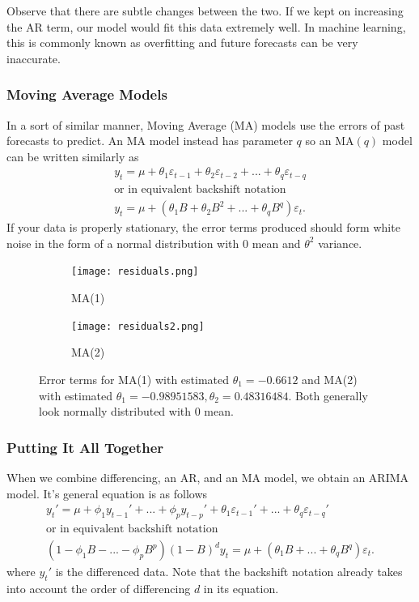 \documentclass{article}
\begin{document}
    Observe that there are subtle changes between the two. If we kept on increasing the AR term, our model would fit this data extremely well. In machine learning, this is commonly known as overfitting and future forecasts can be very inaccurate.

  \subsubsection{Moving Average Models}
    In a sort of similar manner, Moving Average (MA) models use the errors of past forecasts to predict. An MA model instead has parameter $q$ so an MA$(q)$ model can be written similarly as
    \begin{gather*}
      y_t = \mu + \theta_1 \varepsilon_{t-1} + \theta_2 \varepsilon_{t-2} + ... + \theta_q \varepsilon_{t-q}\\
      \text{or in equivalent backshift notation}\\
      y_t = \mu + (\theta_1B + \theta_2B^2 + ... + \theta_qB^q)\varepsilon_t.
    \end{gather*}
    If your data is properly stationary, the error terms produced should form white noise in the form of a normal distribution with $0$ mean and $\theta^2$ variance.

    \begin{figure}[H]
      \centering
      \captionsetup{justification=centering}
      \begin{subfigure}[b]{0.49\linewidth}
        \texttt{[image: residuals.png]}
        \caption{MA(1)}
      \end{subfigure}
      \begin{subfigure}[b]{0.49\linewidth}
        \texttt{[image: residuals2.png]}
        \caption{MA(2)}
      \end{subfigure}
      \caption{Error terms for MA(1) with estimated $\theta_1 = -0.6612$ and MA(2) with estimated $\theta_1 = -0.98951583, \theta_2 = 0.48316484$. Both generally look normally distributed with 0 mean.}
    \end{figure}

  \subsubsection{Putting It All Together}
  When we combine differencing, an AR, and an MA model, we obtain an ARIMA model. It's general equation is as follows
  \begin{gather*}
    y_t' = \mu + \phi_1 y_{t-1}' + ... + \phi_p y_{t-p}' + \theta_1 \varepsilon_{t-1}' + ... + \theta_q \varepsilon_{t-q}'\\
    \text{or in equivalent backshift notation}\\
    (1 - \phi_1B - ... - \phi_pB^p)(1-B)^dy_t = \mu + (\theta_1B + ... + \theta_qB^q)\varepsilon_t.
  \end{gather*}
  where $y_t'$ is the differenced data. Note that the backshift notation already takes into account the order of differencing $d$ in its equation.
\end{document}
